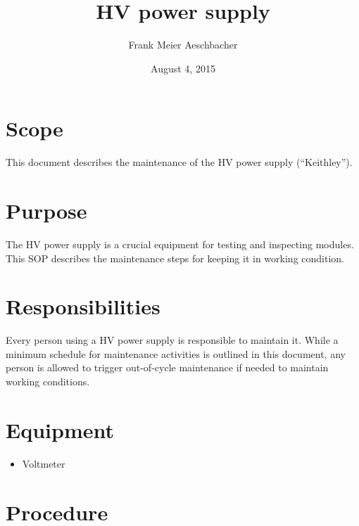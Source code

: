\documentclass[12pt]{unlsilabsop}
\title{HV power supply}
\date{August 4, 2015}
\author{Frank Meier Aeschbacher}
\begin{document}
\maketitle

\section{Scope}
This document describes the maintenance of the HV power supply (``Keithley'').

\section{Purpose}
The HV power supply is a crucial equipment for testing and inspecting modules. This SOP describes the maintenance steps for keeping it in working condition.


\section{Responsibilities}
Every person using a HV power supply is responsible to maintain it. While a minimum schedule for maintenance activities is outlined in this document, any person is allowed to trigger out-of-cycle maintenance if needed to maintain working conditions.

\section{Equipment}

\begin{itemize}
    \item Voltmeter
\end{itemize}


\section{Procedure}
\end{document}
